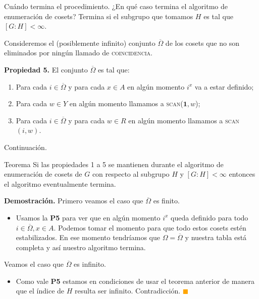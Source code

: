 \documentclass[aspectratio=169, 9pt]{beamer}
\renewcommand\qedsymbol{\textcolor{orange}{$\blacksquare$}}
\newcommand{\coin}{\textsc{coincidencia}}
\newcommand{\scan}{\textsc{scan}}
\newcommand{\ol}{\overline}
\begin{document}
\begin{frame}[fragile]{Cuándo termina el procedimiento.}
	¿En qué caso termina el algoritmo de enumeración de cosets?
	\pause
	Termina si el subgrupo que tomamos $H$ es tal que $[G:H] < \infty$.
	\pause

	Consideremos el (posiblemente infinito) conjunto $\ol \Omega$ de los cosets que no son eliminados por ningún llamado de \coin.

	\pause
	
	\textbf{Propiedad 5.} El conjunto $\ol \Omega$ es tal que:
	\begin{enumerate}
		\item Para cada $i \in \overline \Omega$ y para cada $x \in A$ en algún momento $i^x$ va a estar definido;
		\item Para cada $w \in Y$ en algún momento llamamos a \scan($\textbf{1},w$);
		\item Para cada $i \in \ol \Omega$ y para cada $w \in R$ en algún momento llamamos a \scan$(i, w)$.
	\end{enumerate}
\end{frame}

\begin{frame}[fragile]{Continuación.}
	\begin{alertblock}{Teorema}
		Si las propiedades 1 a 5 se mantienen durante el algoritmo de enumeración de cosets de $G$ con respecto al subgrupo $H$ y $[G:H] < \infty$ entonces el algoritmo eventualmente termina.
	\end{alertblock}
	\pause
	
	\textbf{Demostración.} 
	Primero veamos el caso que $\ol \Omega$ es finito.
	\begin{itemize}
		\pause
		\item Usamos la \textbf{P5} para ver que en algún momento $i^x$ queda definido para todo $i \in \ol\Omega, x \in A$.
		\pause 
		Podemos tomar el momento para que todo estos cosets estén estabilizados.
		\pause
		En ese momento tendríamos que $\Omega = \ol \Omega$ y nuestra tabla está completa y así nuestro algoritmo termina.
	\end{itemize}
	\pause
	Veamos el caso que $\ol \Omega$ es infinito.
	\begin{itemize}
		\pause
		\item Como vale \textbf{P5} estamos en condiciones de usar el teorema anterior de manera que el índice de $H$ resulta ser infinito.
		Contradicción.
		\qedsymbol
	\end{itemize}
		
	
	
\end{frame}
\end{document}
